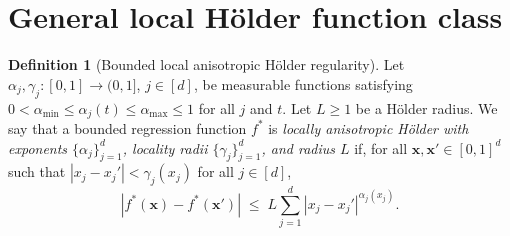 \documentclass[11pt]{article}
\theoremstyle{plain}
\theoremstyle{definition}
\newtheorem{definition}[theorem]{Definition}
\theoremstyle{remark}
\theoremstyle{plain}
\newcommand{\bx}{\mathbf{x}}
\newcommand{\funcclass}{\mathcal{F}}
\newcommand{\1}{\mathbbm{1}}
\newcommand{\e}{\mathbf{e}}
\begin{document}
\section{General local H\"older function class}
\label{appendix:proof-of-holder}



\begin{definition}[Bounded local anisotropic H\"older regularity]
\label{def:local-holder-general}
Let $\alpha_j,\gamma_j:[0,1]\to(0,1]$, $j\in[d]$, be measurable
functions satisfying $0<\alpha_{\min}\le\alpha_j(t)\le\alpha_{\max}\le1$
for all $j$ and $t$. Let $L\ge1$ be a H\"older radius. We say that a
bounded regression function $f^*$ is \emph{locally anisotropic
H\"older with exponents $\{\alpha_j\}_{j=1}^d$, locality radii
$\{\gamma_j\}_{j=1}^d$, and radius $L$} if, for all
$\bx,\bx'\in[0,1]^d$ such that $|x_j-x_j'|<\gamma_j(x_j)$ for all
$j\in[d]$,
\begin{equation}\label{eq:general-local-holder}
|f^*(\bx)-f^*(\bx')|
\;\le\;
L\sum_{j=1}^d |x_j-x_j'|^{\alpha_j(x_j)} .
\end{equation}
\end{definition}
\end{document}
